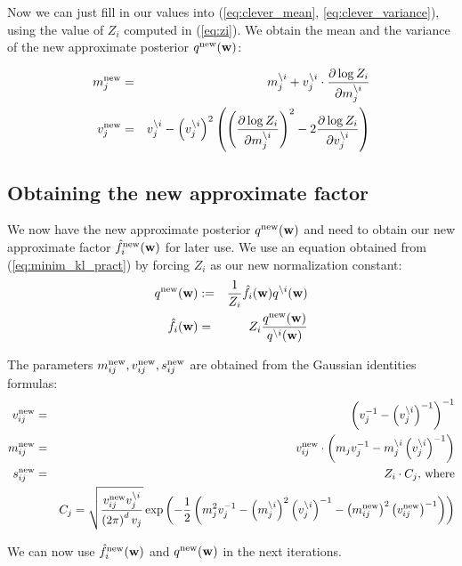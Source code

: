 \documentclass[10pt,a4paper,notitlepage]{article}
\begin{document}
Now we can just fill in our values into (\ref{eq:clever_mean}, \ref{eq:clever_variance}), using the value of $Z_i$ computed in (\ref{eq:zi}). We obtain the mean and the variance of the new approximate posterior $q^{\mathrm{new}}(\mathbf{w})$:

\begin{eqnarray}
m_j^{\mathrm{new}} & = & m_j^{\setminus i} + v_j^{\setminus i}\cdot \frac{\partial \log Z_i}{\partial m_j^{\setminus i}} \\
v_j^{\mathrm{new}} & = & v_j^{\setminus i} - \left(v_j^{\setminus i}\right)^2\left(\left(\frac{\partial \log Z_i}{\partial m_j^{\setminus i}}\right)^2 - 2 \frac{\partial \log Z_i}{\partial v_j^{\setminus i}} \right)
\end{eqnarray}

\subsection{Obtaining the new approximate factor}

We now have the new approximate posterior $q^{\mathrm{new}}(\mathbf{w})$ and need to obtain our new approximate factor $\hat{f}_i^{\mathrm{new}}(\mathbf{w})$ for later use. We use an equation obtained from (\ref{eq:minim_kl_pract}) by forcing $Z_i$ as our new normalization constant:
\begin{eqnarray}
q^{\mathrm{new}}(\mathbf{w}) & := & \frac{1}{Z_i}\hat{f}_i (\mathbf{w}) q^{\setminus i}(\mathbf{w}) \\
\hat{f}_i(\mathbf{w}) & = & Z_i\frac{q^{\mathrm{new}}(\mathbf{w})}{q^{\setminus i}(\mathbf{w})}
\end{eqnarray}

The parameters $m_{ij}^{\mathrm{new}}, v_{ij}^{\mathrm{new}}, s_{ij}^{\mathrm{new}}$ are obtained from the Gaussian identities formulas:
\begin{eqnarray}
v_{ij}^{\mathrm{new}} & = & \left( v_j^{-1} - \left( v_j^{\setminus i} \right)^{-1} \right)^{-1} \\
m_{ij}^{\mathrm{new}} & = & v_{ij}^{\mathrm{new}}\cdot \left( m_j v_j^{-1} - m_j^{\setminus i} \left( v_j^{\setminus i} \right)^{-1} \right) \\
s_{ij}^{\mathrm{new}} & = & Z_i \cdot C_j \mbox{, where} \\ & & C_j = \sqrt{\frac{v_{ij}^{\mathrm{new}}v_j^{\setminus i}}{\left( 2\pi \right)^d v_j }}\exp\left( -\frac{1}{2}\left( m_j^2 v_j^{-1} - \left(m_j^{\setminus i}\right)^2\left(v_j^{\setminus i}\right)^{-1} - \left(m_{ij}^{\mathrm{new}}\right)^2 \left(v_{ij}^{\mathrm{new}}\right)^{-1} \right) \right)
\end{eqnarray}

We can now use $\hat{f}_i^{\mathrm{new}}(\mathbf{w})$ and $q^{\mathrm{new}}(\mathbf{w})$ in the next iterations.
\end{document}
